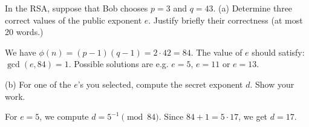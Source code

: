 \documentclass[12pt]{article}
\begin{document}
\smallskip


\begin{problem}
In the RSA, suppose that Bob chooses $p = 3$ and $q = 43$.
(a) Determine three correct values of the
public exponent $e$. Justify briefly their correctness
(at most 20 words.)

\smallskip
We have
$\phi(n) = (p-1)(q-1) = 2\cdot 42 = 84$.
The value of
$e$ should satisfy: $\gcd(e,84)=1$. Possible solutions are e.g.
$e=5$, $e=11$ or $e=13$.


\bigskip
(b) For one of the $e$'s you selected, compute
the secret exponent $d$. Show your work.

\smallskip
For $e=5$, we compute $d = 5^{-1}\pmod{84}$.
Since $84+1 = 5\cdot 17$, we get $d=17$.
\end{problem}



\vfill
\eject
\lineacross
\end{document}
